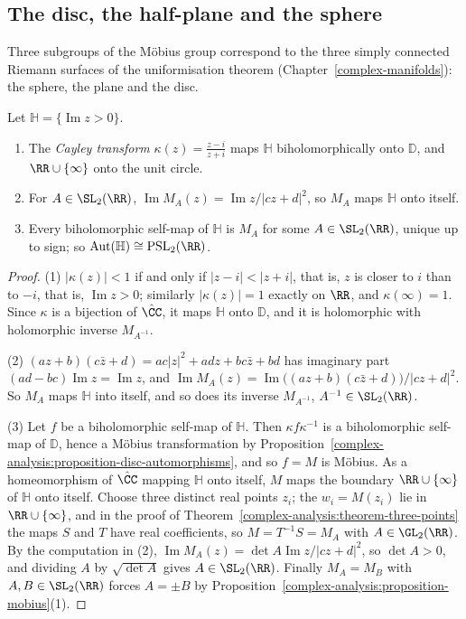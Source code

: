 \subsection{The disc, the half-plane and the sphere}\label{complex-analysis:subsection-mobius-subgroups}

Three subgroups of the M\"obius group correspond to the three simply connected Riemann surfaces of the uniformisation theorem (Chapter~\ref{complex-manifolds}): the sphere, the plane and the disc.

\begin{proposition}\label{complex-analysis:proposition-half-plane}
Let $\mathbb{H} = \{\operatorname{Im}z > 0\}$.
\begin{enumerate}
\item The \emph{Cayley transform} $\kappa(z) = \frac{z - i}{z + i}$ maps $\mathbb{H}$ biholomorphically onto $\mathbb{D}$, and $\RR \cup \{\infty\}$ onto the unit circle.
\item For $A \in \SL_2(\RR)$, $\operatorname{Im}M_A(z) = \operatorname{Im}z/|cz + d|^2$, so $M_A$ maps $\mathbb{H}$ onto itself.
\item Every biholomorphic self-map of $\mathbb{H}$ is $M_A$ for some $A \in \SL_2(\RR)$, unique up to sign; so $\mathrm{Aut}(\mathbb{H}) \cong \mathrm{PSL}_2(\RR)$.
\end{enumerate}
\end{proposition}

\begin{proof}
(1) $|\kappa(z)| < 1$ if and only if $|z - i| < |z + i|$, that is, $z$ is closer to $i$ than to $-i$, that is, $\operatorname{Im}z > 0$; similarly $|\kappa(z)| = 1$ exactly on $\RR$, and $\kappa(\infty) = 1$. Since $\kappa$ is a
bijection of $\hat{\CC}$, it maps $\mathbb{H}$ onto $\mathbb{D}$, and it is holomorphic with holomorphic inverse $M_{A^{-1}}$.

(2) $(az + b)(c\bar z + d) = ac|z|^2 + adz + bc\bar z + bd$ has imaginary part $(ad - bc)\operatorname{Im}z = \operatorname{Im}z$, and $\operatorname{Im}M_A(z) = \operatorname{Im}\bigl((az + b)(c\bar z + d)\bigr)/|cz + d|^2$. So $M_A$
maps $\mathbb{H}$ into itself, and so does its inverse $M_{A^{-1}}$, $A^{-1} \in \SL_2(\RR)$.

(3) Let $f$ be a biholomorphic self-map of $\mathbb{H}$. Then $\kappa f\kappa^{-1}$ is a biholomorphic self-map of $\mathbb{D}$, hence a M\"obius transformation by
Proposition~\ref{complex-analysis:proposition-disc-automorphisms}, and so $f = M$ is M\"obius. As a homeomorphism of $\hat{\CC}$ mapping $\mathbb{H}$ onto itself, $M$ maps the boundary $\RR \cup \{\infty\}$ of $\mathbb{H}$ onto
itself. Choose three distinct real points $z_i$; the $w_i = M(z_i)$ lie in $\RR \cup \{\infty\}$, and in the proof of Theorem~\ref{complex-analysis:theorem-three-points} the maps $S$ and $T$ have real coefficients, so
$M = T^{-1}S = M_A$ with $A \in \GL_2(\RR)$. By the computation in (2), $\operatorname{Im}M_A(z) = \det A\operatorname{Im}z/|cz + d|^2$, so $\det A > 0$, and dividing $A$ by $\sqrt{\det A}$ gives $A \in \SL_2(\RR)$. Finally
$M_A = M_B$ with $A, B \in \SL_2(\RR)$ forces $A = \pm B$ by Proposition~\ref{complex-analysis:proposition-mobius}(1).
\end{proof}

